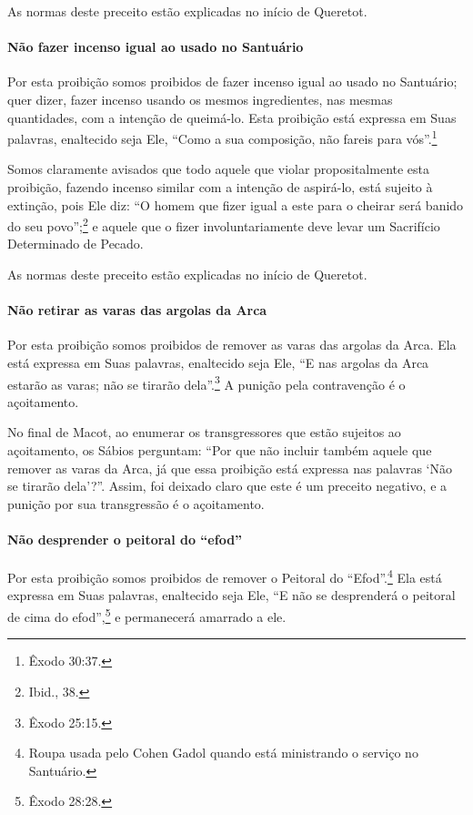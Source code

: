 As normas deste preceito estão explicadas no início de Queretot.

\paragraph{Não fazer incenso igual ao usado no Santuário}

Por esta proibição somos proibidos de fazer incenso igual ao usado no
Santuário; quer dizer, fazer incenso usando os mesmos ingredientes, nas
mesmas quantidades, com a intenção de queimá-lo. Esta proibição está
expressa em Suas palavras, enaltecido seja Ele, ``Como a sua composição,
não fareis para vós''.\footnote{Êxodo 30:37.}

Somos claramente avisados que todo aquele que violar propositalmente
esta proibição, fazendo incenso similar com a intenção de aspirá-lo,
está sujeito à extinção, pois Ele diz: ``O homem que fizer igual a este
para o cheirar será banido do seu povo'';\footnote{Ibid., 38.} e aquele que o
fizer involuntariamente deve levar um Sacrifício Determinado de Pecado.

As normas deste preceito estão explicadas no início de Queretot.

\paragraph{Não retirar as varas das argolas da Arca}

Por esta proibição somos proibidos de remover as varas das argolas da
Arca. Ela está expressa em Suas palavras, enaltecido seja Ele, ``E nas
argolas da Arca estarão as varas; não se tirarão dela''.\footnote{Êxodo 25:15.} A
punição pela contravenção é o açoitamento.

No final de Macot, ao enumerar os transgressores que estão sujeitos ao
açoitamento, os Sábios perguntam: ``Por que não incluir também aquele
que remover as varas da Arca, já que essa proibição está expressa nas
palavras `Não se tirarão dela'?''. Assim, foi deixado claro que este é
um preceito negativo, e a punição por sua transgressão é o açoitamento.

\paragraph{Não desprender o peitoral do ``efod''}

Por esta proibição somos proibidos de remover o Peitoral do
``Efod''.\footnote{Roupa usada pelo Cohen Gadol quando está ministrando o serviço
no Santuário.} Ela está expressa em Suas palavras,
enaltecido seja Ele, ``E não se
desprenderá o peitoral de cima do efod'',\footnote{Êxodo 28:28.} e permanecerá
amarrado a ele.

